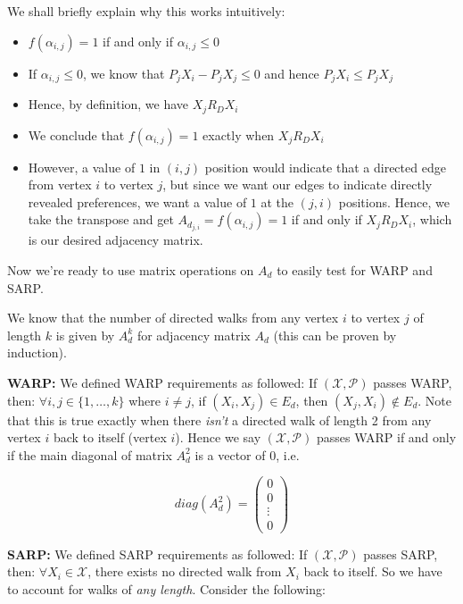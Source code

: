 \documentclass{article} %
\begin{document}
We shall briefly explain why this works intuitively:

\begin{itemize}
    \item $f(\alpha_{i,j})=1$ if and only if $\alpha_{i,j}\leq0$
    \item If $\alpha_{i,j}\leq0$, we know that $P_jX_i-P_jX_j\leq0$ and hence $P_jX_i\leq P_jX_j$
    \item Hence, by definition, we have $X_j R_D X_i$
    \item We conclude that $f(\alpha_{i,j})=1$ exactly when $X_j R_D X_i$
    \item However, a value of $1$ in $(i,j)$ position would indicate that a directed edge from vertex $i$ to vertex $j$, but since we want our edges to indicate directly revealed preferences, we want a value of $1$ at the $(j,i)$ positions. Hence, we take the transpose and get $A_{d_{j,i}}=f(\alpha_{i,j})=1$ if and only if $X_j R_D X_i$, which is our desired adjacency matrix.
\end{itemize}

Now we're ready to use matrix operations on $A_d$ to easily test for WARP and SARP.


We know that the number of directed walks from any vertex $i$ to vertex $j$ of length $k$ is given by $A^k_d$ for adjacency matrix $A_d$ (this can be proven by induction). 


\textbf{WARP:} We defined WARP requirements as followed: If $(\mathcal{X},\mathcal{P})$ passes WARP, then: $\forall i,j\in\{1,\dots,k\}$ where $i\not=j$, if $(X_i,X_j)\in E_d$, then $(X_j, X_i)\not\in E_d$. Note that this is true exactly when there \textit{isn't} a directed walk of length 2 from any vertex $i$ back to itself (vertex $i$). Hence we say $(\mathcal{X},\mathcal{P})$ passes WARP if and only if the main diagonal of matrix $A_d^2$ is a vector of 0, i.e.

\[
diag(A_d^2) =
 \begin{pmatrix}
  0 \\
  0 \\
  \vdots \\
  0
 \end{pmatrix}
\]

\textbf{SARP:} We defined SARP requirements as followed: If $(\mathcal{X},\mathcal{P})$ passes SARP, then: $\forall X_i \in \mathcal{X}$, there exists no directed walk from $X_i$ back to itself. So we have to account for walks of \textit{any length}. Consider the following:
\end{document}
